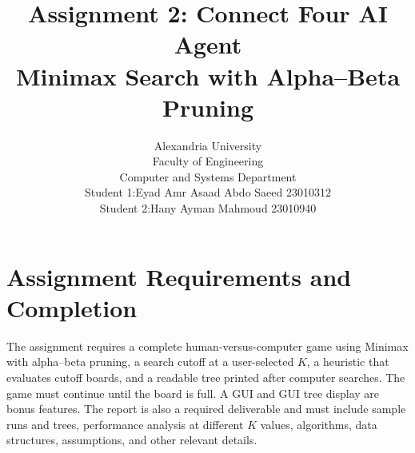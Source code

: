 \documentclass[11pt,a4paper]{article}
\title{\textbf{Assignment 2: Connect Four AI Agent}\\
\large Minimax Search with Alpha--Beta Pruning}
\author{Alexandria University\\
Faculty of Engineering\\
Computer and Systems Department\\[8pt]
Student 1:Eyad Amr Asaad Abdo Saeed 23010312 \\
Student 2:Hany Ayman Mahmoud 23010940 \\
}
\date{}
\begin{document}
\maketitle
\thispagestyle{empty}


\tableofcontents
\newpage

\section{Assignment Requirements and Completion}

The assignment requires a complete human-versus-computer game using Minimax
with alpha--beta pruning, a search cutoff at a user-selected $K$, a heuristic
that evaluates cutoff boards, and a readable tree printed after computer
searches. The game must continue until the board is full. A GUI and GUI tree
display are bonus features. The report is also a required deliverable and must
include sample runs and trees, performance analysis at different $K$ values,
algorithms, data structures, assumptions, and other relevant details.
\end{document}
